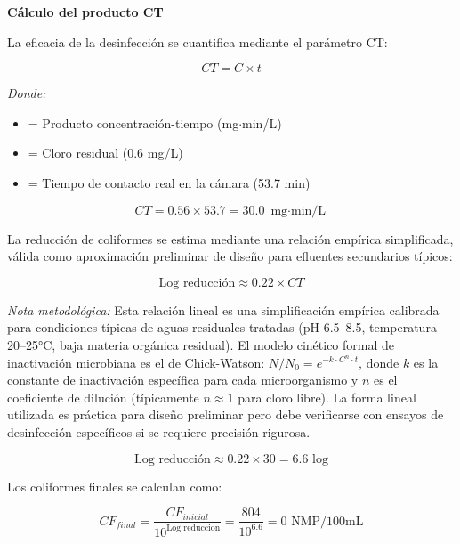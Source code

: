 \documentclass[12pt,a4paper]{article}
\begin{document}
\textbf{Cálculo del producto CT}

La eficacia de la desinfección se cuantifica mediante el parámetro CT:

\begin{equation}
CT = C \times t
\end{equation}

\textit{Donde:}
\begin{itemize}[noitemsep,leftmargin=2em]
    \item[$CT$] = Producto concentración-tiempo (mg$\cdot$min/L)
    \item[$C$] = Cloro residual (0.6 mg/L)
    \item[$t$] = Tiempo de contacto real en la cámara (53.7 min)
\end{itemize}

\begin{equation}
CT = 0.56 \times 53.7 = 30.0 \text{ mg$\cdot$min/L}
\end{equation}

La reducción de coliformes se estima mediante una relación empírica simplificada, válida como aproximación preliminar de diseño para efluentes secundarios típicos:

\begin{equation}
\text{Log reducción} \approx 0.22 \times CT
\end{equation}

\textit{Nota metodológica:} Esta relación lineal es una simplificación empírica calibrada para condiciones típicas de aguas residuales tratadas (pH 6.5--8.5, temperatura 20--25°C, baja materia orgánica residual). El modelo cinético formal de inactivación microbiana es el de Chick-Watson: $N/N_0 = e^{-k \cdot C^n \cdot t}$, donde $k$ es la constante de inactivación específica para cada microorganismo y $n$ es el coeficiente de dilución (típicamente $n \approx 1$ para cloro libre). La forma lineal utilizada es práctica para diseño preliminar pero debe verificarse con ensayos de desinfección específicos si se requiere precisión rigurosa.

\begin{equation}
\text{Log reducción} \approx 0.22 \times 30 = 6.6 \text{ log}
\end{equation}

Los coliformes finales se calculan como:

\begin{equation}
CF_{final} = \frac{CF_{inicial}}{10^{\text{Log reduccion}}} = \frac{804}{10^{6.6}} = 0 \text{ NMP/100mL}
\end{equation}
\end{document}

